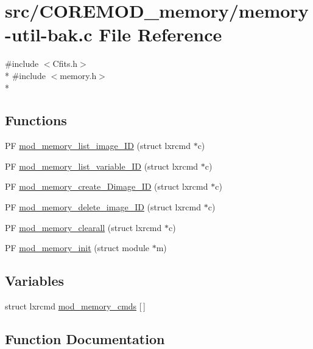 \hypertarget{memory-util-bak_8c}{}\section{src/\+C\+O\+R\+E\+M\+O\+D\+\_\+memory/memory-\/util-\/bak.c File Reference}
\label{memory-util-bak_8c}
{\ttfamily \#include $<$Cfits.\+h$>$}\\*
{\ttfamily \#include $<$memory.\+h$>$}\\*
\subsection*{Functions}
\begin{DoxyCompactItemize}
\item 
P\+F \hyperlink{memory-util-bak_8c_a726a603084661cdde9804771ed4effbd}{mod\+\_\+memory\+\_\+list\+\_\+image\+\_\+\+I\+D} (struct lxrcmd $\ast$c)
\item 
P\+F \hyperlink{memory-util-bak_8c_a2c9d01f20eaa6f60dad3250105d7a5ee}{mod\+\_\+memory\+\_\+list\+\_\+variable\+\_\+\+I\+D} (struct lxrcmd $\ast$c)
\item 
P\+F \hyperlink{memory-util-bak_8c_a568ab756155971ba66789611996a13e4}{mod\+\_\+memory\+\_\+create\+\_\+Dimage\+\_\+\+I\+D} (struct lxrcmd $\ast$c)
\item 
P\+F \hyperlink{memory-util-bak_8c_abc825a2ddf37777ae6925b242fdaac8f}{mod\+\_\+memory\+\_\+delete\+\_\+image\+\_\+\+I\+D} (struct lxrcmd $\ast$c)
\item 
P\+F \hyperlink{memory-util-bak_8c_a6ca5475168daaf1a7e36283ccbec5856}{mod\+\_\+memory\+\_\+clearall} (struct lxrcmd $\ast$c)
\item 
P\+F \hyperlink{memory-util-bak_8c_a40ae03fec034d9ae5dd46beeb878dc65}{mod\+\_\+memory\+\_\+init} (struct module $\ast$m)
\end{DoxyCompactItemize}
\subsection*{Variables}
\begin{DoxyCompactItemize}
\item 
struct lxrcmd \hyperlink{memory-util-bak_8c_a2cf116839ba2fdb2d9fed443b032d1ca}{mod\+\_\+memory\+\_\+cmds} \mbox{[}$\,$\mbox{]}
\end{DoxyCompactItemize}


\subsection{Function Documentation}
\hypertarget{memory-util-bak_8c_a6ca5475168daaf1a7e36283ccbec5856}{}
